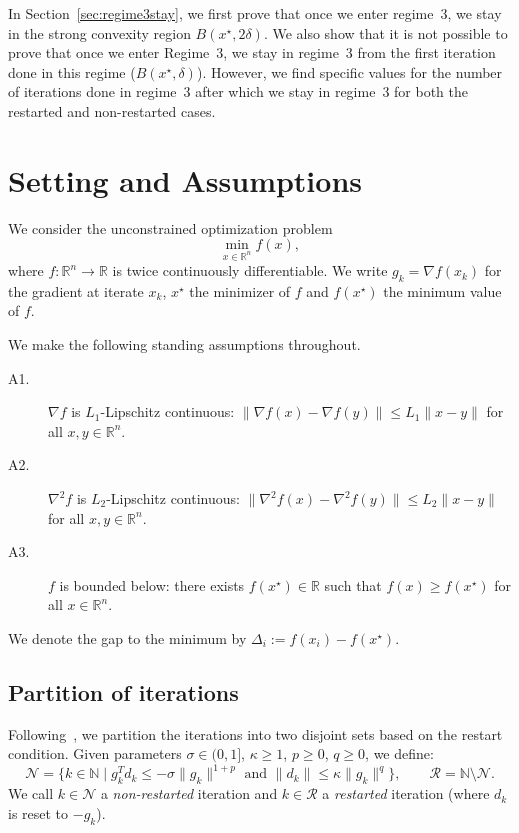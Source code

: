\documentclass{article}
\begin{document}
In Section~\ref{sec:regime3stay}, we first prove that once we enter regime~3, we stay in the strong convexity
region $B(x^\star, 2\delta)$. We also show that it is not possible to prove that once we enter Regime~3, we stay in 
regime~3 from the first iteration done in this regime ($B(x^\star, \delta)$). However, we find specific values for the number of iterations done in regime~3 after which
we stay in regime~3 for both the restarted and non-restarted cases.


\section{Setting and Assumptions}
\label{sec:setting}

We consider the unconstrained optimization problem
\begin{equation}
\label{eq:problem}
\min_{x \in \mathbb{R}^n} f(x),
\end{equation}
where $f : \mathbb{R}^n \to \mathbb{R}$ is twice continuously differentiable. 
We write $g_k = \nabla f(x_k)$ for the gradient at iterate $x_k$, $x^\star$ the minimizer of $f$ and 
$f(x^\star)$ the minimum value of $f$.

We make the following standing assumptions throughout.

\begin{description}
    \item[A1.] $\nabla f$ is $L_1$-Lipschitz continuous: $\|\nabla f(x) - \nabla f(y)\| \leq L_1 \|x - y\|$ for all $x, y \in \mathbb{R}^n$.
    \item[A2.] $\nabla^2 f$ is $L_2$-Lipschitz continuous: $\|\nabla^2 f(x) - \nabla^2 f(y)\| \leq L_2 \|x - y\|$ for all $x, y \in \mathbb{R}^n$.
    \item[A3.] $f$ is bounded below: there exists $f(x^\star) \in \mathbb{R}$ such that $f(x) \geq f(x^\star)$ for all $x \in \mathbb{R}^n$.
\end{description}

We denote the gap to the minimum by $\Delta_i := f(x_i) - f(x^\star)$.

\subsection{Partition of iterations}

Following~\cite{RoyerChan2022}, we partition the iterations into two disjoint sets based on the restart condition. Given parameters $\sigma \in (0,1]$, $\kappa \geq 1$, $p \geq 0$, $q \geq 0$, we define:
\begin{equation}
\label{eq:partition}
\mathcal{N} = \{k \in \mathbb{N} \mid g_k^T d_k \leq -\sigma\|g_k\|^{1+p} \text{ and } \|d_k\| \leq \kappa\|g_k\|^q\}, \qquad \mathcal{R} = \mathbb{N} \setminus \mathcal{N}.
\end{equation}
We call $k \in \mathcal{N}$ a \emph{non-restarted} iteration and $k \in \mathcal{R}$ a \emph{restarted} iteration (where $d_k$ is reset to $-g_k$).
\end{document}
